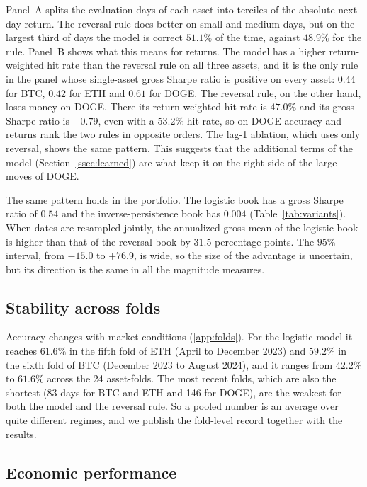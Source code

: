 \documentclass[preprint,12pt,authoryear,a4paper]{elsarticle}
\begin{document}
Panel~A splits the evaluation days of each asset into terciles of the absolute
next-day return. The reversal rule does better on small and medium days, but on the
largest third of days the model is correct $51.1\%$ of the time, against $48.9\%$
for the rule. Panel~B shows what this means for returns. The model has a higher
return-weighted hit rate than the reversal rule on all three assets, and it is the
only rule in the panel whose single-asset gross Sharpe ratio is positive on every
asset: $0.44$ for BTC, $0.42$ for ETH and $0.61$ for DOGE. The reversal rule, on the
other hand, loses money on DOGE. There its return-weighted hit rate is $47.0\%$ and
its gross Sharpe ratio is $-0.79$, even with a $53.2\%$ hit rate, so on DOGE
accuracy and returns rank the two rules in opposite orders. The lag-1 ablation,
which uses only reversal, shows the same pattern. This suggests that the additional
terms of the model (Section~\ref{ssec:learned}) are what keep it on the right side
of the large moves of DOGE.

The same pattern holds in the portfolio. The logistic book has a gross Sharpe ratio
of $0.54$ and the inverse-persistence book has $0.004$ (Table~\ref{tab:variants}).
When dates are resampled jointly, the annualized gross mean of the logistic book is
higher than that of the reversal book by $31.5$ percentage points. The $95\%$
interval, from $-15.0$ to $+76.9$, is wide, so the size of the advantage is
uncertain, but its direction is the same in all the magnitude measures.

\subsection{Stability across folds}

Accuracy changes with market conditions (\ref{app:folds}). For the logistic model
it reaches $61.6\%$ in the fifth fold of ETH (April to December 2023) and $59.2\%$
in the sixth fold of BTC (December 2023 to August 2024), and it ranges from
$42.2\%$ to $61.6\%$ across the 24 asset-folds. The most recent folds, which are
also the shortest (83 days for BTC and ETH and 146 for DOGE), are the weakest for
both the model and the reversal rule. So a pooled number is an average over quite
different regimes, and we publish the fold-level record together with the results.

\subsection{Economic performance}\label{ssec:costs}
\end{document}

